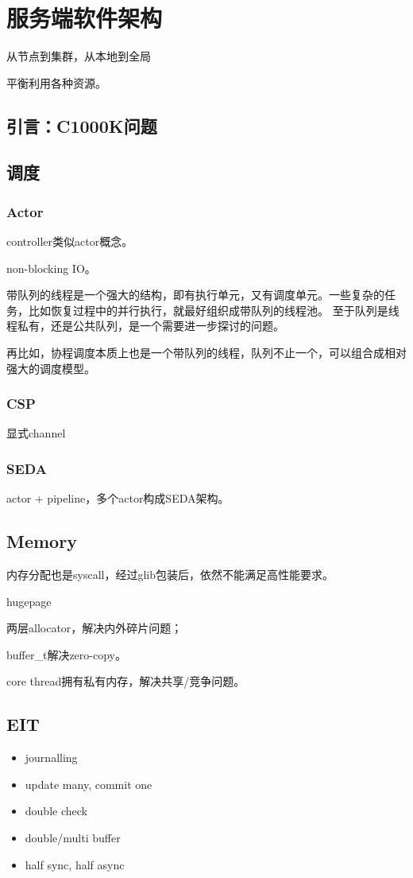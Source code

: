 \chapter{服务端软件架构}

从节点到集群，从本地到全局

平衡利用各种资源。

\section{引言：C1000K问题}

\section{调度}

\subsection{Actor}

controller类似actor概念。

non-blocking IO。

带队列的线程是一个强大的结构，即有执行单元，又有调度单元。一些复杂的任务，比如恢复过程中的并行执行，就最好组织成带队列的线程池。
至于队列是线程私有，还是公共队列，是一个需要进一步探讨的问题。

再比如，协程调度本质上也是一个带队列的线程，队列不止一个，可以组合成相对强大的调度模型。

\subsection{CSP}

显式channel

\subsection{SEDA}

actor + pipeline，多个actor构成SEDA架构。

\section{Memory}

内存分配也是syscall，经过glib包装后，依然不能满足高性能要求。

\begin{enumbox}
\item hugepage
\item 两层allocator，解决内外碎片问题；
\item buffer\_t解决zero-copy。
\item core thread拥有私有内存，解决共享/竞争问题。
\end{enumbox}

\section{EIT}

\begin{itemize}
    \item journalling
    \item update many, commit one
    \item double check
    \item double/multi buffer
    \item half sync, half async
\end{itemize}
